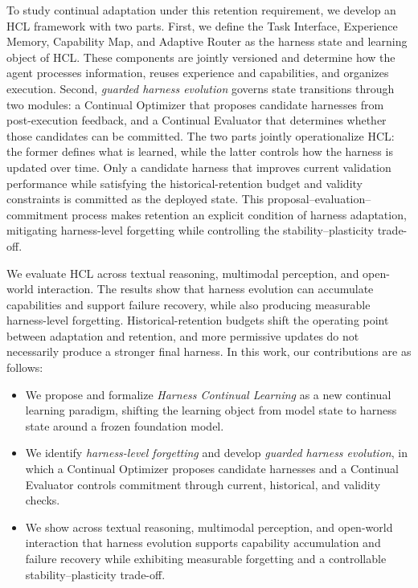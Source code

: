 \documentclass{article}
\begin{document}
To study continual adaptation under this retention requirement, we develop an
HCL framework with two parts. First, we define the Task Interface, Experience
Memory, Capability Map, and Adaptive Router as the harness state and learning
object of HCL. These components are jointly versioned and determine how the
agent processes information, reuses experience and capabilities, and organizes
execution. Second, \textit{guarded harness evolution} governs state transitions through two modules: a Continual Optimizer that proposes candidate harnesses from post-execution feedback, and a Continual Evaluator that determines whether those candidates can be committed. The two parts jointly operationalize HCL: the former defines what is learned, while the latter controls how the harness is updated over time. Only a candidate harness that improves current validation performance while satisfying the historical-retention budget and validity constraints is committed as the deployed state. This proposal--evaluation--commitment process makes retention an explicit condition of harness adaptation, mitigating harness-level forgetting while controlling
the stability--plasticity trade-off.

We evaluate HCL across textual reasoning, multimodal perception, and open-world interaction. The
results show that harness evolution can accumulate capabilities and support failure recovery, while
also producing measurable harness-level forgetting. Historical-retention budgets shift the operating
point between adaptation and retention, and more permissive updates do not necessarily produce a
stronger final harness. In this work, our contributions are as follows:
\begin{itemize}

\item We propose and formalize \emph{Harness Continual Learning} as a new
continual learning paradigm, shifting the learning object from model state to harness state around a frozen foundation model.

\item We identify \emph{harness-level forgetting} and develop \emph{guarded harness evolution}, in which a Continual Optimizer proposes candidate harnesses and a
Continual Evaluator controls commitment through current, historical, and
validity checks.

\item We show across textual reasoning, multimodal perception, and open-world
interaction that harness evolution supports capability accumulation and
failure recovery while exhibiting measurable forgetting and a controllable
stability--plasticity trade-off.

\end{itemize}
\end{document}
